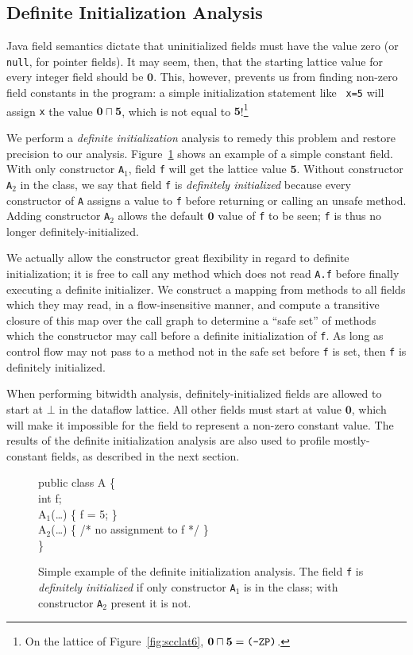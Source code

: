 \documentclass[oribibl]{llncs}
\newcommand{\meet}{\ensuremath{\sqcap}}
\begin{document}
\subsection{Definite Initialization Analysis}
Java field semantics dictate that uninitialized fields must have
the value zero (or {\tt null}, for pointer fields).  It may seem,
then, that the starting lattice value for every integer field should
be $\mathbf{0}$.  This, however, prevents us from finding non-zero field
constants in the program: a simple initialization statement like {\tt
  x=5} will assign {\tt x} the value $\mathbf{0}\meet\mathbf{5}$,
which is not equal to $\mathbf{5}$!\footnote{On the lattice of
  Figure~\ref{fig:scclat6}, $\mathbf{0}\meet\mathbf{5}=\text{\tt
    (-ZP)}$.}

We perform a {\it definite initialization} analysis to remedy this
problem and restore precision to our analysis.
Figure~\ref{fig:definit-example} shows an example of a simple
constant field.
With only constructor {\tt A$_1$}, field {\tt f} will get the
lattice value $\mathbf{5}$.  Without constructor {\tt A$_2$} in the class,
we say that field {\tt f} is {\it definitely initialized} because
every constructor of {\tt A} assigns a value to {\tt f} before
returning or calling an unsafe method.
Adding constructor {\tt A$_2$} allows the
default $\mathbf{0}$ value of {\tt f} to be seen; {\tt f} is thus no longer
definitely-initialized.

We actually allow the constructor great flexibility in regard to
definite initialization; it is free to call any method which does not
read {\tt A.f} before finally executing a definite initializer.
We construct a mapping from methods to all
fields which they may read, in a flow-insensitive manner, and compute
a transitive closure of this map over the call graph to determine 
a ``safe set'' of
methods which the constructor may call before a definite
initialization of {\tt f}.  As long as control flow may not pass to a
method not in the safe set before {\tt f} is set, then {\tt f} is
definitely initialized.

When performing bitwidth analysis,
definitely-initialized fields are allowed to start at $\bot$ in the
dataflow lattice.  All other fields must start at value
$\mathbf{0}$, which will make it impossible for the field to represent a
non-zero constant value.  The results of the definite initialization
analysis are also used to profile mostly-constant fields, as described
in the next section.
%
\begin{figure}[tp]
\small\renewcommand{\baselinestretch}{0.5}\begin{samplecode}
public class A \{\\
\>int f;\\
\>A$_1$(\ldots) \{ f = 5; \}\\
\>A$_2$(\ldots) \{ /* no assignment to f */ \}\\
\}
\end{samplecode}
\caption{Simple example of the definite initialization analysis.
The field {\tt f} is {\it definitely initialized} if only constructor
{\tt A$_1$} is in the class; with constructor {\tt A$_2$} present it
is not.}
\label{fig:definit-example}
\end{figure}
\end{document}
